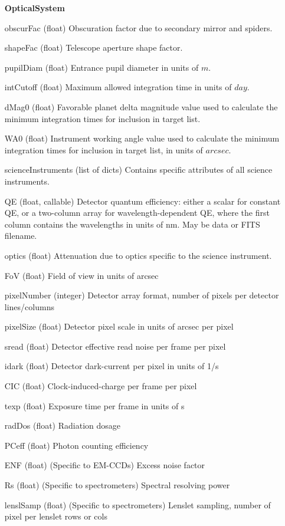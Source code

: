 \documentclass[cleanfoot]{asme2ej}
\begin{document}
\begin{itemize}[leftmargin=1.5in,font={\ttfamily}]
\item[\textbf{OpticalSystem}]
\item[obscurFac] (float) Obscuration factor due to secondary mirror and spiders.
\item[shapeFac] (float)  Telescope aperture shape factor.
\item[pupilDiam] (float) Entrance pupil diameter in units of $m$.
\item[intCutoff] (float)  Maximum allowed integration time in units of $ day $.
\item[dMag0] (float) Favorable planet delta magnitude value used to calculate the minimum integration times for inclusion in target list.
\item[WA0] (float) Instrument working angle value used to calculate the minimum integration times for inclusion in target list, in units of $arcsec$.
\item[scienceInstruments] (list of dicts) Contains specific attributes of all science instruments. 
\item[QE] (float, callable) Detector quantum efficiency: either a scalar for constant QE, or a two-column array for wavelength-dependent QE, where the first column contains the wavelengths in units of nm. May be data or FITS filename.
\item[optics] (float) Attenuation due to optics specific to the science instrument.
\item[FoV] (float) Field of view in units of arcsec
\item[pixelNumber] (integer) Detector array format, number of pixels per detector lines/columns
\item[pixelSize] (float) Detector pixel scale in units of arcsec per pixel
\item[sread] (float) Detector effective read noise per frame per pixel
\item[idark] (float) Detector dark-current per pixel in units of 1/s
\item[CIC] (float) Clock-induced-charge per frame per pixel
\item[texp] (float) Exposure time per frame in units of s
\item[radDos] (float) Radiation dosage
\item[PCeff] (float) Photon counting efficiency
\item[ENF] (float) (Specific to EM-CCDs) Excess noise factor
\item[Rs] (float) (Specific to spectrometers) Spectral resolving power
\item[lenslSamp] (float) (Specific to spectrometers) Lenslet sampling, number of pixel per lenslet rows or cols

\end{itemize}
\end{document}
